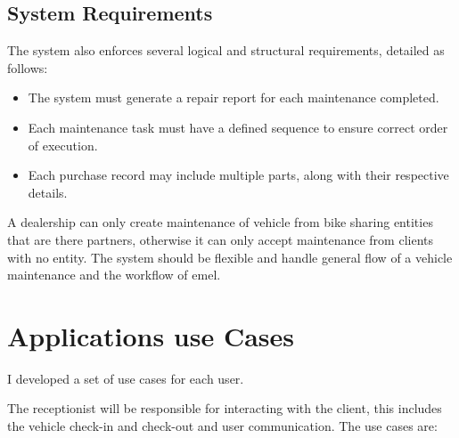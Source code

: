 \subsection{System Requirements}
The system also enforces several logical and structural requirements, detailed as follows:
\begin{itemize}
    \item The system must generate a repair report for each maintenance completed.
    \item Each maintenance task must have a defined sequence to ensure correct order of execution.
    \item Each purchase record may include multiple parts, along with their respective details.
\end{itemize}

A dealership can only create maintenance of vehicle from bike sharing entities that are there partners, otherwise it can only accept maintenance from clients with no entity.
The system should be flexible and handle general flow of a vehicle maintenance and the workflow of \ac{emel}.  

\section{Applications use Cases} 
I developed a set of use cases for each user.

The receptionist will be responsible for interacting with the client, this includes the vehicle check-in and check-out and user communication. 
The use cases are:

